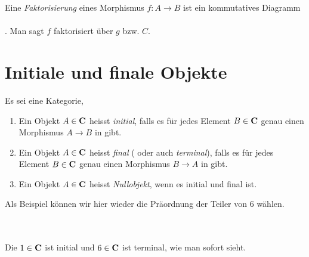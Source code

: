 \documentclass{article}
\begin{document}
	\begin{defi}[Faktorisierung]
	 \cite[Definition 2.4.8]{Bra}
	Eine \emph{Faktorisierung} eines Morphismus \( f:A \to B \) ist ein kommutatives Diagramm \\

		 \\

	. Man sagt $f$ faktorisiert \"uber $g$ bzw. $ C $.
	\end{defi}
\newpage




\section{Initiale und finale Objekte}
	\begin{defi}
 		\cite[Definition 2.5.1]{Bra}
		Es sei \CatC eine Kategorie,
		\begin{enumerate}
			\item	 Ein Objekt \( A \in \mathbf{C} \) heisst \emph{initial}, 
			falls es f\"ur jedes Element \( B \in \mathbf{C} \) genau einen Morphismus \(A \to B \) in \CatC gibt.
			\item	 Ein Objekt \( A \in \mathbf{C} \) heisst \emph{final} ( oder auch \emph{terminal}), 
			falls es f\"ur jedes Element \( B \in \mathbf{C} \) genau einen Morphismus \(B \to A \) in \CatC gibt.
			\item	Ein Objekt \( A \in \mathbf{C} \) heisst \emph{Nullobjekt}, wenn es initial und final ist.
		\end{enumerate}
	\end{defi}

	Als Beispiel k\"onnen wir hier wieder die Pr\"aordnung der Teiler von 6 w\"ahlen.\\
	\begin{bsp}\\
	 \\
	Die \( 1 \in \mathbf{C} \) ist initial und  \(6 \in \mathbf{C} \) ist terminal, wie man sofort sieht.

	\end{bsp}
	
\end{document}

